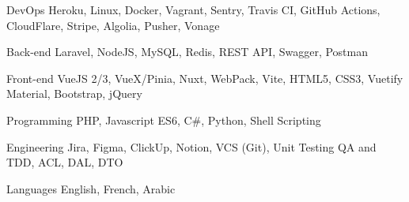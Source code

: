 

\begin{cvskills}

  \cvskill
    {DevOps} %
    {Heroku, Linux, Docker, Vagrant, Sentry, Travis CI, GitHub Actions, CloudFlare, Stripe, Algolia, Pusher, Vonage} %

  \cvskill
    {Back-end} %
    {Laravel, NodeJS, MySQL, Redis, REST API, Swagger, Postman} %

  \cvskill
    {Front-end} %
    {VueJS 2/3, VueX/Pinia, Nuxt, WebPack, Vite, HTML5, CSS3, Vuetify Material, Bootstrap, jQuery} %

  \cvskill
    {Programming} %
    {PHP, Javascript ES6, C\#, Python, Shell Scripting} %

  \cvskill
    {Engineering} %
    {Jira, Figma, ClickUp, Notion, VCS (Git), Unit Testing QA and TDD, ACL, DAL, DTO} %


  \cvskill
    {Languages} %
    {English, French, Arabic} %

\end{cvskills}

